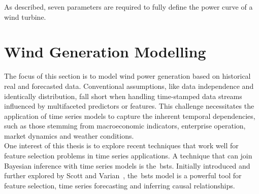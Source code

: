     As described, seven parameters are required to fully define the power curve of a wind turbine.



\section{Wind Generation Modelling}
    \label{sec:wind_generation_modelling}

    The focus of this section is to model wind power generation based on historical real and forecasted data.
    Conventional assumptions, like data independence and identically distribution, fall short when handling time-stamped
    data streams influenced by multifaceted predictors or features.
    This challenge necessitates the application of time series models to capture the inherent temporal dependencies,
    such as those stemming from macroeconomic indicators, enterprise operation, market dynamics and weather conditions.\\

    One interest of this thesis is to explore recent techniques that work well for feature selection problems in
    time series applications.
    A technique that can join Bayesian inference with time series models is the~\gls{bsts}.
    Initially introduced and further explored by Scott and Varian~\cite{scott_predicting_2013, scott_bayesian_2013},
    the~\gls{bsts} model is a powerful tool for feature selection, time series forecasting and inferring causal relationships. \\

